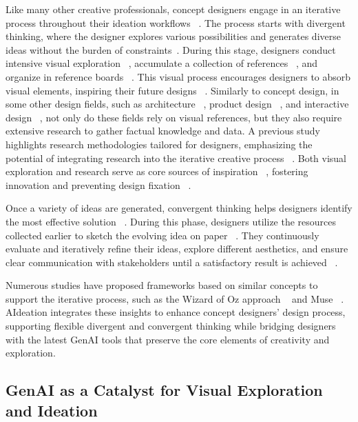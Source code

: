Like many other creative professionals, concept designers engage in an iterative process throughout their ideation workflows ~\cite{adams1999cognitive}. The process starts with divergent thinking, where the designer explores various possibilities and generates diverse ideas without the burden of constraints~\cite{rw5,rw8,rw9,rw10,Imagination}. During this stage, designers conduct intensive visual exploration ~\cite{rw11,rw12}, accumulate a collection of references ~\cite{rw17}, and organize in reference boards ~\cite{rw18}. This visual process encourages designers to absorb visual elements, inspiring their future designs ~\cite{linsey2011experimental}. Similarly to concept design, in some other design fields, such as architecture ~\cite{newland1987understanding}, product design ~\cite{boston1998design}, and interactive design ~\cite{park1993empirically}, not only do these fields rely on visual references, but they also require extensive research to gather factual knowledge and data. A previous study highlights research methodologies tailored for designers, emphasizing the potential of integrating research into the iterative creative process ~\cite{Navarro2022Research}. 
Both visual exploration and research serve as core sources of inspiration ~\cite{eckert2000sources}, fostering innovation and preventing design fixation ~\cite{rw4, rw21}.

Once a variety of ideas are generated, convergent thinking helps designers identify the most effective solution ~\cite{rw6}. During this phase, designers utilize the resources collected earlier to sketch the evolving idea on paper ~\cite{rw14, rw15, rw16}. They continuously evaluate and iteratively refine their ideas, explore different aesthetics, and ensure clear communication with stakeholders until a satisfactory result is achieved ~\cite{johnson1997analysis, Stamps1999Demographic, Stigliani2018The}. 

Numerous studies have proposed frameworks based on similar concepts to support the iterative process, such as the Wizard of Oz approach ~\cite{dow2005wizard} and Muse ~\cite{muller2013muse}. AIdeation integrates these insights to enhance concept designers' design process, supporting flexible divergent and convergent thinking while bridging designers with the latest GenAI tools that preserve the core elements of creativity and exploration.



\subsection{GenAI as a Catalyst for Visual Exploration and Ideation}


